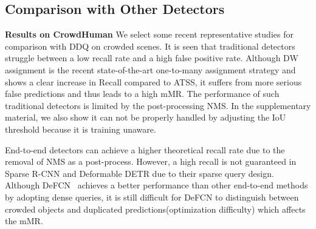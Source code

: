 \documentclass[10pt,twocolumn,letterpaper]{article}
\begin{document}
\begin{table}[!h]
    \centering
    \caption{\textbf{From Deformable DETR*(D-DETR)  to DDQ DETR}. TS D-DETR stands for the naive two-stage version. Dense means initializing the content part with feature embedding. DQS stands for distinct queries selection. AUX-Decoder means the auxiliary loss for dense queries in the decoder. The flops only has comparative meaning and does not contain custom cuda operators}
\vspace{-3mm}
    \label{tab:ddq-detr}
\end{table}

\subsection{Comparison with Other Detectors}

\noindent \textbf{Results on CrowdHuman}  We select some recent representative studies for comparison with DDQ on crowded scenes. It is seen that traditional detectors struggle between a low recall rate and a high false positive rate. Although DW~\cite{li2022dual} assignment is the recent state-of-the-art one-to-many assignment strategy and shows a clear increase in Recall compared to ATSS, it suffers from more serious false predictions and thus leads to a high mMR. The performance of such traditional detectors is limited by the post-processing NMS. In the supplementary material, we also show it can not be properly handled by adjusting the IoU threshold because it is training unaware.

End-to-end detectors can achieve a higher theoretical recall rate due to the removal of NMS as a post-process. However, a high recall is not guaranteed in Sparse R-CNN and Deformable DETR due to their sparse query design. Although DeFCN~\cite{wang2021end} achieves a better performance than other end-to-end methods by adopting dense queries, it is still difficult for DeFCN to distinguish between crowded objects and duplicated predictions(optimization difficulty) which affects the mMR.
\end{document}
